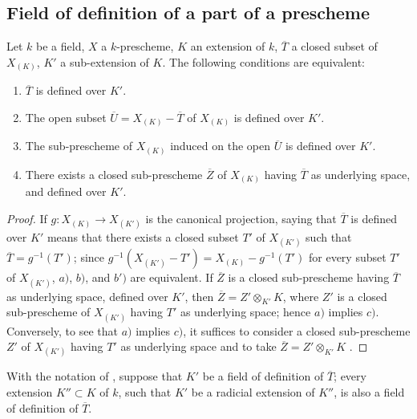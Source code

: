 \subsection{Field of definition of a part of a prescheme}
\label{subsection:IV.4.9}

\begin{proposition}[4.9.1]
\label{IV.4.9.1}
Let $k$ be a field, $X$ a $k$-prescheme, $K$ an extension of $k$, $\overline{T}$ a closed subset of $X_{(K)}$, $K'$ a sub-extension of $K$.
The following conditions are equivalent:
\begin{enumerate}[label=\emph{\alph*)}]
  \item $\overline{T}$ is defined over $K'$.
  \item The open subset $\overline{U}=X_{(K)}-\overline{T}$ of $X_{(K)}$ is defined over $K'$.
  \item[\emph{b$'$)}] The sub-prescheme of $X_{(K)}$ induced on the open $\overline{U}$ is defined over $K'$.
  \item[\emph{c)}] There exists a closed sub-prescheme $\overline{Z}$ of $X_{(K)}$ having $\overline{T}$ as underlying space, and defined over $K'$.
\end{enumerate}
\end{proposition}

\begin{proof}
If $g:X_{(K)}\to X_{(K')}$ is the canonical projection, saying that $\overline{T}$ is defined over $K'$ means that there exists a closed subset $T'$ of $X_{(K')}$ such that $\overline{T}=g^{-1}(T')$; since $g^{-1}(X_{(K')}-T')=X_{(K)}-g^{-1}(T')$ for every subset $T'$ of $X_{(K')}$, $a)$, $b)$, and $b')$ are equivalent.
If $\overline{Z}$ is a closed sub-prescheme having $\overline{T}$ as underlying space, defined over $K'$, then $\overline{Z}=Z'\otimes_{K'} K$, where $Z'$ is a closed sub-prescheme of $X_{(K')}$ having $T'$ as underlying space; hence $a)$ implies $c)$.
Conversely, to see that $a)$ implies $c)$, it suffices to consider a closed sub-prescheme $Z'$ of $X_{(K')}$ having $T'$ as underlying space and to take $\overline{Z}=Z'\otimes_{K'} K$ .
\end{proof}

\begin{corollary}[4.9.2]
\label{IV.4.9.2}
With the notation of , suppose that $K'$ be a field of definition of $\overline{T}$; every extension $K''\subset K$ of $k$, such that $K'$ be a radicial extension of $K''$, is also a field of definition of $\overline{T}$.
\end{corollary}

